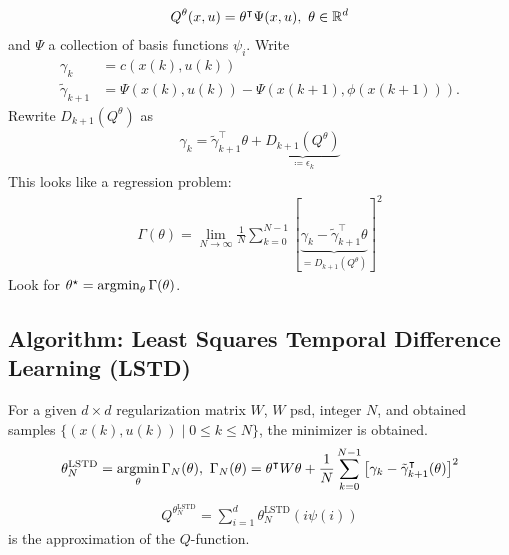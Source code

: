 \begin{align*}
    Q^\theta(x,u)=\theta^\intercal \Psi(x,u),\ \theta\in\mathbb{R}^d
\end{align*}
and \(\Psi\) a collection of basis functions \(\psi_i\). Write 
\begin{align*}
  \gamma_k&=c(x(k),u(k))\\ 
  \tilde{\gamma}_{k+1}&=\Psi(x(k),u(k))-\Psi(x(k+1),\phi(x(k+1))).  
\end{align*}
Rewrite \(D_{k+1}(Q^\theta)\) as 
\begin{align*}
    \gamma_k=\tilde{\gamma}_{k+1}^\intercal\theta+\underbrace{D_{k+1}(Q^\theta)}_{\coloneqq \epsilon_k}
\end{align*}
This looks like a regression problem:
\begin{align*}
    \Gamma(\theta)=\lim_{N\to\infty}\frac{1}{N}\sum_{k=0}^{N-1}\left[\underbrace{\gamma_k-\tilde{\gamma}_{k+1}^\intercal\theta}_{=D_{k+1}(Q^\theta)}\right]^2
\end{align*}
Look for \(\theta^\star=\operatorname*{\text{argmin}}_{\theta}\Gamma(\theta)\).

\subsection{Algorithm: Least Squares Temporal Difference Learning (LSTD)}
For a given \(d\times d\) regularization matrix \(W\), \(W\) psd, integer \(N\), and 
obtained samples \(\{(x(k),u(k))\mid 0\leq k\leq N\}\), the minimizer is obtained.
\begin{equation}\label{eq:theta_lstd}
    \theta_{N}^{\text{LSTD}}=\argmin_\theta \Gamma_N(\theta),\ \Gamma_N(\theta)=\theta^\intercal W \theta+\frac{1}{N}\sum_{k=0}^{N-1}\left[\gamma_k-\tilde{\gamma}_{k+1}^\intercal (\theta)\right]^2
\end{equation}
\begin{align*}
    Q^{\theta_N^\text{LSTD}}=\sum_{i=1}^d\theta_N^{\text{LSTD}}(i\psi(i))
\end{align*}
is the approximation of the \(Q\)-function.

